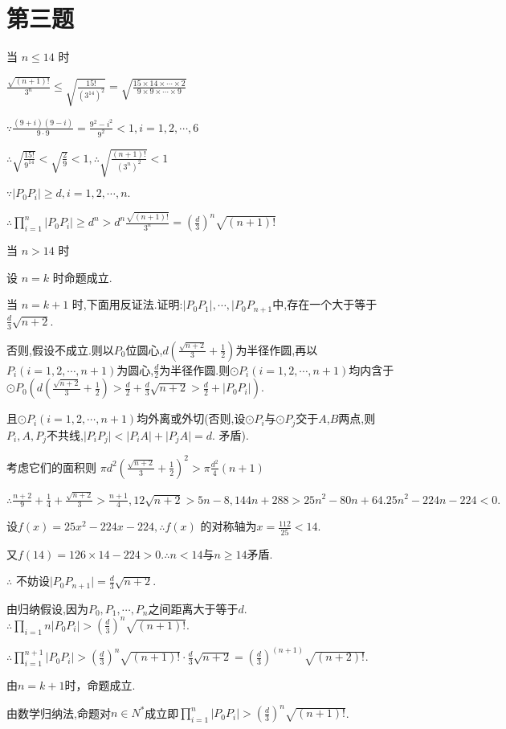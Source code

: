 \section{第三题}
当 $ n \le 14 $ 时 \par
$ \frac{\sqrt{(n+1)!}}{3^n} \le \sqrt{\frac{15!}{(3^{14})^2}} = \sqrt{\frac{15 \times 14 \times \cdots \times 2}{9 \times 9 \times \cdots \times 9}} $ \par
$ \because \frac{(9+i)(9-i)}{9 \cdot 9} = \frac{9^2-i^2}{9^2} < 1, i = 1,2,\cdots,6 $ \par
$ \therefore \sqrt{\frac{15!}{9^14}} < \sqrt{\frac{2}{9}} < 1, \therefore \sqrt{\frac{(n+1)!}{(3^n)^2}} < 1 $ \par
$ \because \lvert P_0P_i \rvert \ge d, i = 1,2,\cdots,n. $ \par
$ \therefore \prod_{i=1}^{n} \lvert P_0P_i \rvert \ge d^n > d^n\frac{\sqrt{(n+1)!}}{3^n} = (\frac{d}{3})^n\sqrt{(n+1)!} $ \par
当 $ n > 14 $ 时 \par
设 $ n = k $ 时命题成立. \par
当 $ n = k + 1 $ 时,下面用反证法.证明:$\lvert P_0P_1 \rvert,\cdots,\lvert P_0P_{n+1}$中,存在一个大于等于$\frac{d}{3}\sqrt{n+2}$. \par
否则,假设不成立.则以$P_0$位圆心,$d(\frac{\sqrt{n+2}}{3}+\frac{1}{2})$为半径作圆,再以$P_i(i=1,2,\cdots,n+1)$为圆心,$\frac{d}{2}$为半径作圆.则$ \odot P_i(i=1,2,\cdots,n+1) $均内含于$\odot P_0(d(\frac{\sqrt{n+2}}{3}+\frac{1}{2})>\frac{d}{2}+\frac{d}{3}\sqrt{n+2}>\frac{d}{2}+\lvert P_0P_i \rvert )$. \par
且$\odot P_i(i=1,2,\cdots,n+1)$均外离或外切(否则,设$\odot P_i$与$\odot P_j$交于$A$,$B$两点,则$P_i,A,P_j$不共线,$ \lvert P_iP_j \rvert < \lvert P_iA \rvert + \lvert P_jA \rvert = d. $ 矛盾). \par
考虑它们的面积则 $ \pi d^2(\frac{\sqrt{n+2}}{3}+\frac{1}{2})^2>\pi\frac{d^2}{4}(n+1) $ \par
$ \therefore \frac{n+2}{9} + \frac{1}{4} + \frac{\sqrt{n + 2}}{3} > \frac{n+1}{4},12\sqrt{n+2}>5n-8,144n+288>25n^2-80n+64.25n^2-224n-224<0. $ \par
设$f(x)=25x^2-224x-224, \therefore f(x) $ 的对称轴为$x=\frac{112}{25}<14$. \par
又$f(14)=126 \times 14 -224 > 0. \therefore n < 14$与$n \ge 14$矛盾. \par
$ \therefore$ 不妨设$\lvert P_0P_{n+1} \rvert = \frac{d}{3}\sqrt{n+2}$. \par
由归纳假设,因为$P_0,P_1,\cdots,P_n$之间距离大于等于$d$. $\therefore \prod_{i=1}{n}\lvert P_0P_i \rvert > (\frac{d}{3})^n\sqrt{(n+1)!} $. \par
$ \therefore \prod_{i=1}^{n+1} \lvert P_0P_i \rvert > (\frac{d}{3})^n\sqrt{(n+1)!} \cdot \frac{d}{3}\sqrt{n+2} = (\frac{d}{3})^(n+1)\sqrt{(n+2)!}. $ \par
由$n=k+1$时，命题成立. \par
由数学归纳法,命题对$n \in N^{*}$成立即$\prod_{i=1}^{n} \lvert P_0P_i \rvert > (\frac{d}{3})^n\sqrt{(n+1)!} $.
